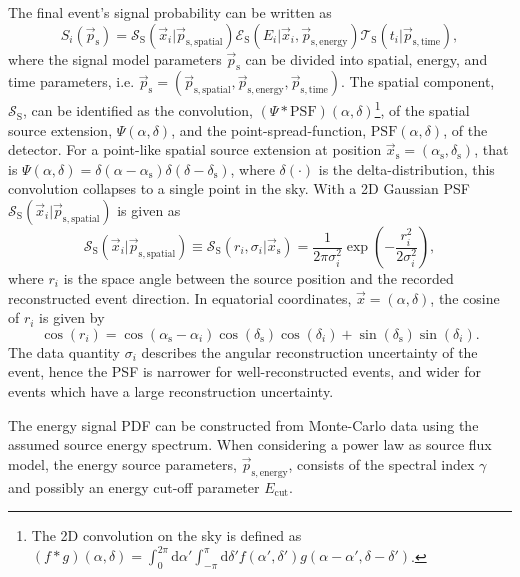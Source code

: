 \documentclass{article}
\newcommand{\ps}{\vec{p}_{\mathrm{s}}}
\newcommand{\xs}{\vec{x}_{\mathrm{s}}}
\begin{document}
The final event's signal probability can be written as
\begin{equation}
 S_i(\ps) = \mathcal{S}_{\mathrm{S}}(\vec{x}_i|\vec{p}_{\mathrm{s,spatial}}) \mathcal{E}_{\mathrm{S}}(E_i|\vec{x}_i,\vec{p}_{\mathrm{s,energy}}) \mathcal{T}_{\mathrm{S}}(t_i|\vec{p}_{\mathrm{s,time}}),
 \label{eq:Si}
\end{equation}
where the signal model parameters $\ps$ can be divided into spatial, energy, and
time parameters, i.e. $\ps = (\vec{p}_{\mathrm{s,spatial}},
\vec{p}_{\mathrm{s,energy}}, \vec{p}_{\mathrm{s,time}})$. The spatial component,
$\mathcal{S}_{\mathrm{S}}$, can be identified as the convolution,
$(\Psi \ast \mathrm{PSF})(\alpha,\delta)$\footnote{The 2D convolution on the sky
is defined as
$(f \ast g)(\alpha,\delta) = \int_{0}^{2\pi} \mathrm{d}\alpha' \int_{-\pi}^{\pi} \mathrm{d}\delta' f(\alpha',\delta')g(\alpha-\alpha',\delta-\delta')$.},
of the spatial source extension, $\Psi(\alpha,\delta)$, and the point-spread-function,
$\mathrm{PSF}(\alpha,\delta)$, of the detector.
For a point-like spatial source extension at position
$\xs = (\alpha_{\mathrm{s}},\delta_{\mathrm{s}})$, that is
$\Psi(\alpha,\delta) = \delta(\alpha-\alpha_{\mathrm{s}})\delta(\delta-\delta_{\mathrm{s}})$,
where $\delta(\cdot)$ is the delta-distribution, this convolution collapses to
a single point in the sky. With a 2D Gaussian PSF
$\mathcal{S}_{\mathrm{S}}(\vec{x}_i|\vec{p}_{\mathrm{s,spatial}})$ is given as
\begin{equation}
 \mathcal{S}_{\mathrm{S}}(\vec{x}_i|\vec{p}_{\mathrm{s,spatial}}) \equiv \mathcal{S}_{\mathrm{S}}(r_i,\sigma_i|\xs) = \frac{1}{2\pi\sigma_i^2}\exp\left({-\frac{r_i^2}{2\sigma_i^2}}\right),
\end{equation}
where $r_i$ is the space angle between the source position and the recorded
reconstructed event direction. In equatorial coordinates,
$\vec{x} = (\alpha,\delta)$, the cosine of $r_i$ is given by
\begin{equation}
 \cos(r_i) = \cos(\alpha_{\mathrm{s}} - \alpha_i) \cos(\delta_{\mathrm{s}})\cos({\delta_i}) + \sin(\delta_{\mathrm{s}})\sin(\delta_i).
\end{equation}
The data quantity $\sigma_i$ describes the angular reconstruction uncertainty of
the event, hence the PSF is narrower for well-reconstructed events, and wider
for events which have a large reconstruction uncertainty.

The energy signal PDF can be constructed from Monte-Carlo data using the assumed
source energy spectrum.
When considering a power law as source flux model, the energy source parameters,
$\vec{p}_{\mathrm{s,energy}}$, consists of the spectral index $\gamma$ and possibly
an energy cut-off parameter $E_{\mathrm{cut}}$.
\end{document}
